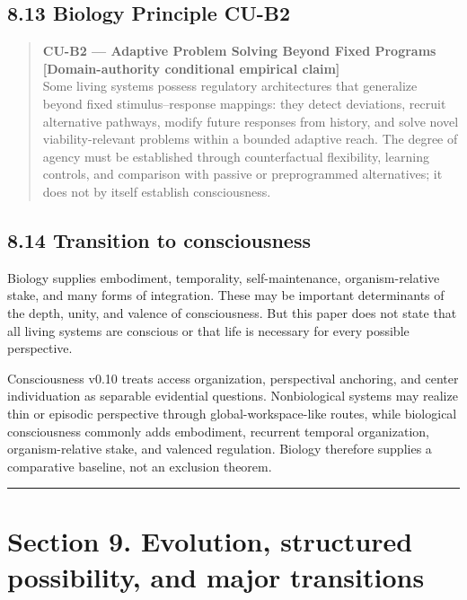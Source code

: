 \documentclass[
  11pt,
]{article}
\begin{document}
\subsection{8.13 Biology Principle CU-B2}\label{biology-principle-cu-b2}

\begin{quote}
\textbf{CU-B2 --- Adaptive Problem Solving Beyond Fixed Programs}
\textbf{{[}Domain-authority conditional empirical claim{]}}\\
Some living systems possess regulatory architectures that generalize
beyond fixed stimulus--response mappings: they detect deviations,
recruit alternative pathways, modify future responses from history, and
solve novel viability-relevant problems within a bounded adaptive reach.
The degree of agency must be established through counterfactual
flexibility, learning controls, and comparison with passive or
preprogrammed alternatives; it does not by itself establish
consciousness.
\end{quote}

\subsection{8.14 Transition to
consciousness}\label{transition-to-consciousness}

Biology supplies embodiment, temporality, self-maintenance,
organism-relative stake, and many forms of integration. These may be
important determinants of the depth, unity, and valence of
consciousness. But this paper does not state that all living systems are
conscious or that life is necessary for every possible perspective.

Consciousness v0.10 treats access organization, perspectival anchoring,
and center individuation as separable evidential questions.
Nonbiological systems may realize thin or episodic perspective through
global-workspace-like routes, while biological consciousness commonly
adds embodiment, recurrent temporal organization, organism-relative
stake, and valenced regulation. Biology therefore supplies a comparative
baseline, not an exclusion theorem.

\begin{center}\rule{0.5\linewidth}{0.5pt}\end{center}

\section{Section 9. Evolution, structured possibility, and major
transitions}\label{section-9.-evolution-structured-possibility-and-major-transitions}
\end{document}
